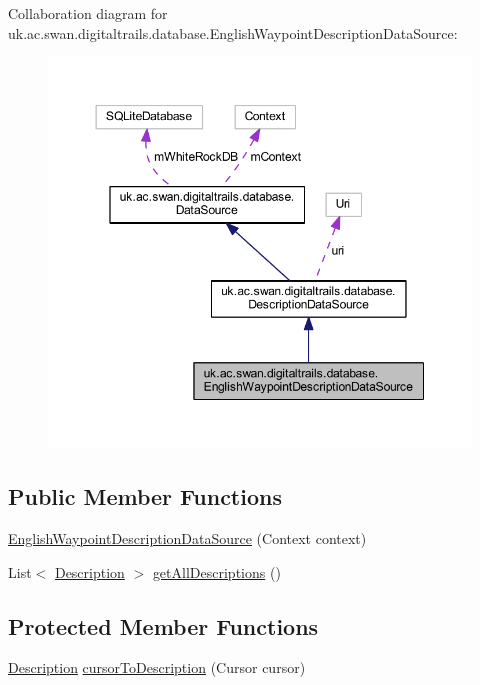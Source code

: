 Collaboration diagram for uk.\+ac.\+swan.\+digitaltrails.\+database.\+English\+Waypoint\+Description\+Data\+Source\+:\nopagebreak
\begin{figure}[H]
\begin{center}
\leavevmode
\includegraphics[width=350pt]{classuk_1_1ac_1_1swan_1_1digitaltrails_1_1database_1_1_english_waypoint_description_data_source__coll__graph}
\end{center}
\end{figure}
\subsection*{Public Member Functions}
\begin{DoxyCompactItemize}
\item 
\hyperlink{classuk_1_1ac_1_1swan_1_1digitaltrails_1_1database_1_1_english_waypoint_description_data_source_a554f6862ff0be09a2b0697d3c101a75a}{English\+Waypoint\+Description\+Data\+Source} (Context context)
\item 
List$<$ \hyperlink{classuk_1_1ac_1_1swan_1_1digitaltrails_1_1components_1_1_description}{Description} $>$ \hyperlink{classuk_1_1ac_1_1swan_1_1digitaltrails_1_1database_1_1_english_waypoint_description_data_source_a10a4b3c7c1904fd00a3314c2adffd647}{get\+All\+Descriptions} ()
\end{DoxyCompactItemize}
\subsection*{Protected Member Functions}
\begin{DoxyCompactItemize}
\item 
\hyperlink{classuk_1_1ac_1_1swan_1_1digitaltrails_1_1components_1_1_description}{Description} \hyperlink{classuk_1_1ac_1_1swan_1_1digitaltrails_1_1database_1_1_english_waypoint_description_data_source_ae98aeda33fe535d249f6d51e2d5efea2}{cursor\+To\+Description} (Cursor cursor)
\end{DoxyCompactItemize}
